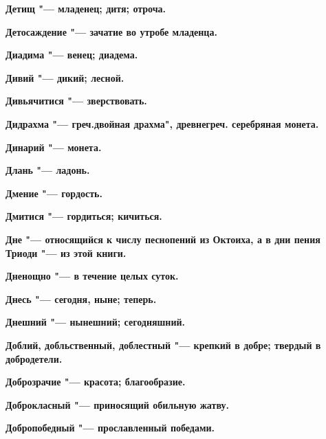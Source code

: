\begin{multicols}{2}
\bfseries Детищ\normalfont{} "--- младенец; дитя; отроча. 




\bfseries Детосаждение\normalfont{} "--- зачатие во утробе младенца. 




\bfseries Диадима\normalfont{} "--- венец; диадема. 




\bfseries Дивий\normalfont{} "--- дикий; лесной. 




\bfseries Дивьячитися\normalfont{} "--- зверствовать. 




\bfseries Дидрахма\normalfont{} "--- греч.двойная драхма", древнегреч. серебряная монета. 




\bfseries Динарий\normalfont{} "--- монета. 




\bfseries Длань\normalfont{} "--- ладонь. 




\bfseries Дмение\normalfont{} "--- гордость. 




\bfseries Дмитися\normalfont{} "--- гордиться; кичиться. 




\bfseries Дне\normalfont{} "--- относящийся к числу песнопений из Октоиха, а в дни пения Триоди "--- из этой книги. 




\bfseries Дненощно\normalfont{} "--- в течение целых суток. 




\bfseries Днесь\normalfont{} "--- сегодня, ныне; теперь. 




\bfseries Днешний\normalfont{} "--- нынешний; сегодняшний. 




\bfseries Доблий, добльственный, доблестный\normalfont{} "--- крепкий в добре; твердый в добродетели. 




\bfseries Доброзрачие\normalfont{} "--- красота; благообразие. 




\bfseries Доброкласный\normalfont{} "--- приносящий обильную жатву. 




\bfseries Добропобедный\normalfont{} "--- прославленный победами. 





\end{multicols}
